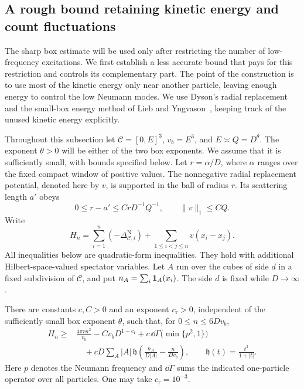 \subsection{A rough bound retaining kinetic energy and count fluctuations}
\label{en:rough-section}

The sharp box estimate will be used only after restricting the number of
low-frequency excitations.  We first establish a less accurate bound that
pays for this restriction and controls its complementary part.  The point
of the construction is to use most of the kinetic energy only near another
particle, leaving enough energy to control the low Neumann modes.  We use
Dyson's radial replacement and the small-box energy method of
Lieb and Yngvason~\cite{Dyson,LY}, keeping track of the unused kinetic
energy explicitly.

Throughout this subsection let \(\mathcal C=[0,E]^3\),
\(v_b=E^3\), and \(E\asymp Q=D^\theta\).  The exponent \(\theta>0\)
will be either of the two box exponents.  We assume that it is sufficiently
small, with bounds specified below.  Let \(r=\alpha/D\), where \(\alpha\)
ranges over the fixed compact window of positive values.  The nonnegative
radial replacement potential, denoted here by \(v\), is supported in the
ball of radius \(r\).  Its scattering length \(a'\) obeys
\[
  0\le r-a'\le CrD^{-1}Q^{-1},\qquad \|v\|_1\le CQ.
\]
Write
\[
 H_n=\sum_{i=1}^n(-\Delta_{\mathcal C,i}^{\mathrm N})
       +\sum_{1\le i<j\le n}v(x_i-x_j).
\]
All inequalities below are quadratic-form inequalities.  They hold with
additional Hilbert-space-valued spectator variables.  Let \(A\) run over
the cubes of side \(d\) in a fixed subdivision of \(\mathcal C\), and
put \(n_A=\sum_i\mathbf 1_A(x_i)\).  The side \(d\) is fixed while
\(D\to\infty\).

\begin{lemma}\label{en:rough-bound}\label{en:rough}
There are constants \(c,C>0\) and an exponent \(c_{\mathrm r}>0\), independent
of the sufficiently small box exponent \(\theta\), such that, for
\(0\le n\le6Dv_b\),
\begin{equation}\label{en:rough-ineq}
 \begin{split}
 H_n\ge {}&\frac{4\pi r n^2}{v_b}-Cv_bD^{1-c_{\mathrm r}}
       +c\,\dd\Gamma\bigl(\min\{p^2,1\}\bigr)\\
 &\quad+cD\sum_A |A|\,
   \mathfrak h\left(\frac{n_A}{D|A|}-\frac{n}{Dv_b}\right),
 \qquad \mathfrak h(t)=\frac{t^2}{1+|t|}.
 \end{split}
\end{equation}
Here \(p\) denotes the Neumann frequency and \(\dd\Gamma\) sums
the indicated one-particle operator over all particles.  One may take
\(c_{\mathrm r}=10^{-3}\).
\end{lemma}

